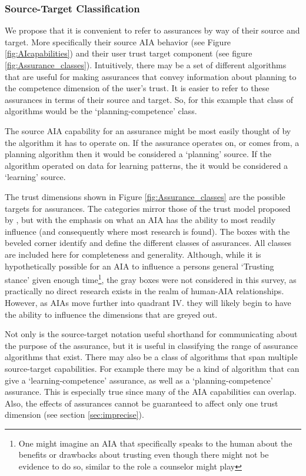 \subsubsection{Source-Target Classification}
    We propose that it is convenient to refer to assurances by way of their source and target. More specifically their source AIA behavior (see Figure \ref{fig:AIcapabilities}) and their user trust target component (see figure \ref{fig:Assurance_classes}). Intuitively, there may be a set of different algorithms that are useful for making assurances that convey information about planning to the competence dimension of the user's trust. It is easier to refer to these assurances in terms of their source and target. So, for this example that class of algorithms would be the `planning-competence' class.

    The source AIA capability for an assurance might be most easily thought of by the algorithm it has to operate on. If the assurance operates on, or comes from, a planning algorithm then it would be considered a `planning' source. If the algorithm operated on data for learning patterns, the it would be considered a `learning' source.

    The trust dimensions shown in Figure \ref{fig:Assurance_classes} are the possible targets for assurances. The categories mirror those of the trust model proposed by \citet{McKnight2001-fa}, but with the emphasis on what an AIA has the ability to most readily influence (and consequently where most research is found). The boxes with the beveled corner identify and define the different classes of assurances. All classes are included here for completeness and generality. Although, while it is hypothetically possible for an AIA to influence a persons general `Trusting stance' given enough time\footnote{One might imagine an AIA that specifically speaks to the human about the benefits or drawbacks about trusting even though there might not be evidence to do so, similar to the role a counselor might play}, the gray boxes were not considered in this survey, as practically no direct research exists in the realm of human-AIA relationships. However, as AIAs move further into quadrant IV. they will likely begin to have the ability to influence the dimensions that are greyed out.
    
    Not only is the source-target notation useful shorthand for communicating about the purpose of the assurance, but it is useful in classifying the range of assurance algorithms that exist. There may also be a class of algorithms that span multiple source-target capabilities. For example there may be a kind of algorithm that can give a `learning-competence' assurance, as well as a `planning-competence' assurance. This is especially true since many of the AIA capabilities can overlap. Also, the effects of assurances cannot be guaranteed to affect only one trust dimension (see section \ref{sec:imprecise}).
